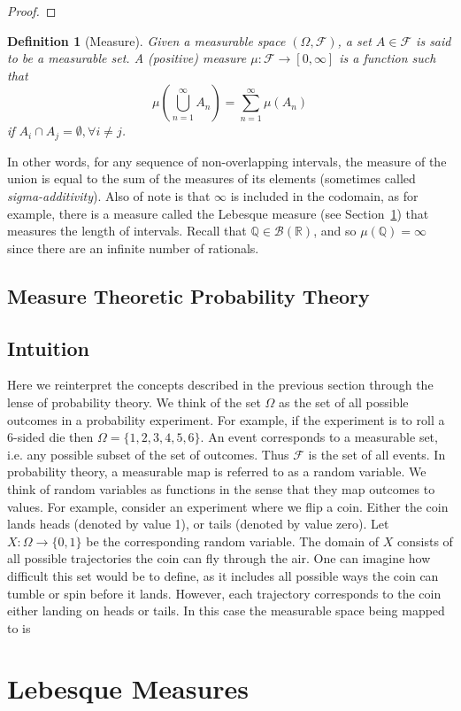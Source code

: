 \documentclass[10pt, oneside]{article}
\newcommand{\R}{\mathbb{R}}
\newcommand{\Q}{\mathbb{Q}}
\newtheorem{defn}{Definition}
\begin{document}
\begin{proof}
    
\end{proof}

\begin{defn}[Measure]
    \label{defn:measure}
    Given a measurable space $(\Omega,\mathcal{F})$, a set $A\in \mathcal{F}$ is said to be a measurable set.
    A (positive) measure $\mu:\mathcal{F}\to [0,\infty]$ is a function such that $$\mu(\bigcup_{n=1}^{\infty}A_n)=\sum_{n=1}^{\infty}\mu(A_n)$$ if $A_i\cap A_j=\emptyset,\forall i\ne j$. 
\end{defn}
In other words, for any sequence of non-overlapping intervals, the measure of the union is equal to the sum of the measures of its elements (sometimes called \emph{sigma-additivity}).
Also of note is that $\infty$ is included in the codomain, as for example, there is a measure called the Lebesque measure (see Section~\ref{sec:lebesque}) that measures the length of intervals. Recall that $\Q\in\mathcal{B}(\R)$, and so $\mu(\Q)=\infty$ since there are an infinite number of rationals.

\subsection{Measure Theoretic Probability Theory}

\subsection{Intuition}
Here we reinterpret the concepts described in the previous section through the lense of probability theory.
We think of the set $\Omega$ as the set of all possible outcomes in a probability experiment. For example, if the experiment is to roll a 6-sided die then $\Omega=\{1,2,3,4,5,6\}$.
An event corresponds to a measurable set, i.e. any possible subset of the set of outcomes.
Thus $\mathcal{F}$ is the set of all events.
In probability theory, a measurable map is referred to as a random variable.
We think of random variables as functions in the sense that they map outcomes to values.
For example, consider an experiment where we flip a coin. 
Either the coin lands heads (denoted by value 1), or tails (denoted by value zero). 
Let $X:\Omega\to\{0,1\}$ be the corresponding random variable.
The domain of $X$ consists of all possible trajectories the coin can fly through the air. One can imagine how difficult this set would be to define, as it includes all possible ways the coin can tumble or spin before it lands.
However, each trajectory corresponds to the coin either landing on heads or tails.
In this case the measurable space being mapped to is 

\section{Lebesque Measures}
\label{sec:lebesque}
\end{document}
